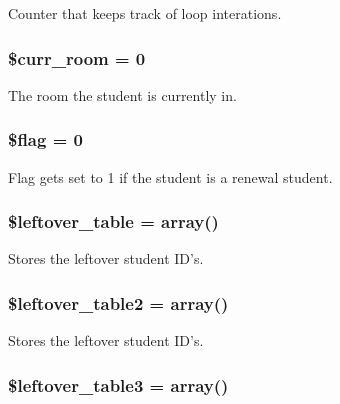 \-Counter that keeps track of loop interations. \hypertarget{autoStudent_8php_a8595546d7518e1e6d8955325b0f74995}{
\subsubsection[{\$curr\-\_\-room}]{\setlength{\rightskip}{0pt plus 5cm}\$curr\-\_\-room = 0}}\label{autoStudent_8php_a8595546d7518e1e6d8955325b0f74995}
\-The room the student is currently in. \hypertarget{autoStudent_8php_acf5d6dd3ee125abb9a2523b30bc47d02}{
\subsubsection[{\$flag}]{\setlength{\rightskip}{0pt plus 5cm}\$flag = 0}}\label{autoStudent_8php_acf5d6dd3ee125abb9a2523b30bc47d02}
\-Flag gets set to 1 if the student is a renewal student. \hypertarget{autoStudent_8php_ae55d8d34900566c9493c0acabfdeee48}{
\subsubsection[{\$leftover\-\_\-table}]{\setlength{\rightskip}{0pt plus 5cm}\$leftover\-\_\-table = array()}}\label{autoStudent_8php_ae55d8d34900566c9493c0acabfdeee48}
\-Stores the leftover student \-I\-D's. \hypertarget{autoStudent_8php_a08b673911720e8532a341a87be7d7f68}{
\subsubsection[{\$leftover\-\_\-table2}]{\setlength{\rightskip}{0pt plus 5cm}\$leftover\-\_\-table2 = array()}}\label{autoStudent_8php_a08b673911720e8532a341a87be7d7f68}
\-Stores the leftover student \-I\-D's. \hypertarget{autoStudent_8php_a35b65b2170992bf2380327e701448d3d}{
\subsubsection[{\$leftover\-\_\-table3}]{\setlength{\rightskip}{0pt plus 5cm}\$leftover\-\_\-table3 = array()}}\label{autoStudent_8php_a35b65b2170992bf2380327e701448d3d}
